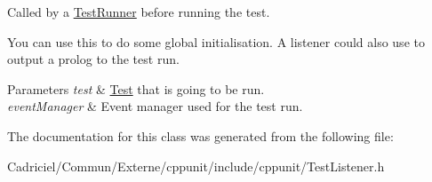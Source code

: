 Called by a \hyperlink{class_test_runner}{Test\+Runner} before running the test. 

You can use this to do some global initialisation. A listener could also use to output a \textquotesingle{}prolog\textquotesingle{} to the test run.


\begin{DoxyParams}{Parameters}
{\em test} & \hyperlink{class_test}{Test} that is going to be run. \\
\hline
{\em event\+Manager} & Event manager used for the test run. \\
\hline
\end{DoxyParams}


The documentation for this class was generated from the following file\+:\begin{DoxyCompactItemize}
\item 
Cadriciel/\+Commun/\+Externe/cppunit/include/cppunit/Test\+Listener.\+h\end{DoxyCompactItemize}
